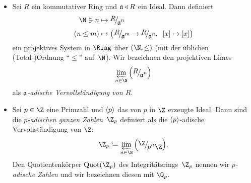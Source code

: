\begin{thBeispiel}
    \begin{thDef}\hfill
        \begin{itemize}
            \item
                Sei $R$ ein kommutativer Ring und $\mathfrak a\triangleleft R$ ein
                Ideal. Dann definiert
                \begin{align*}
                    \N \ni n   &\mapsto \Quot{R}{\mf a^n}  \\[3pt]
                    (n\leq m)  &\mapsto \bigl(\mkern2mu
                        \Quot{R}{\mf a^m}  \to \Quot{R}{\mf a^n}, \;\;
                                       [x] \mapsto [x]
                    \mkern1mu \bigr)
                \end{align*}
                ein projektives System in $\Ring$ über $(\N,\leq)$ (mit der
                üblichen (Total-)Ordnung \enquote{$\leq$} auf~$\N$). Wir
                bezeichnen den projektiven Limes
                \[ \varprojlim_{n\in\N} \, \Bigl( \Quot{R}{\mf a^n} \Bigr) \]
                als \emph{$\mathfrak a$-adische Vervollständigung von $R$}.
                
            \item
                Sei $p\in\Z$ eine Primzahl und $\langle p\rangle$ das von $p$ in $\Z$
                erzeugte Ideal. Dann sind die \emph{$p$-adischen ganzen
                Zahlen~$\Z_p$} definiert als die $\langle p\rangle$-adische
                Vervollständigung von $\Z$:
                \[ \Z_p \defeq \varprojlim_{n\in\N} \, \Bigl( \ZQuot{p^n} \Bigr)
                . \]
                Den Quotientenkörper $\operatorname{Quot}(\Z_p)$ des
                Integritätsrings~$\Z_p$ nennen wir \emph{$p$-adische Zahlen} und
                wir bezeichnen diesen mit $\Q_p$.
        \end{itemize}
    \end{thDef}
    

\end{thBeispiel}
